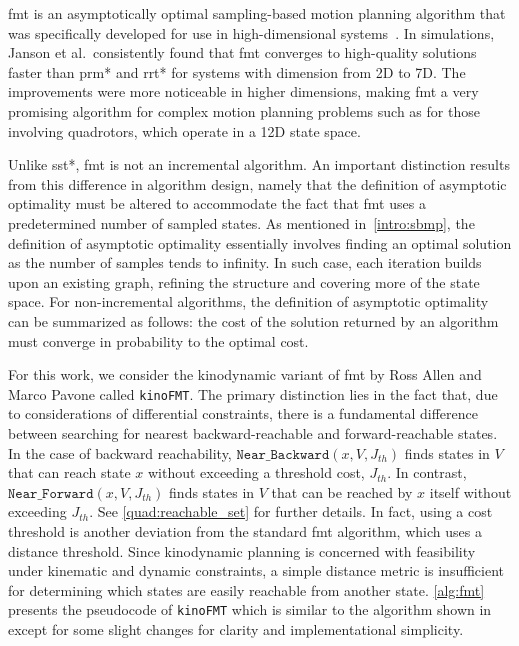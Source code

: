 \gls{fmt} is an asymptotically optimal sampling-based motion planning algorithm that was specifically developed for use in high-dimensional systems~\cite{Janson2015}. In simulations, Janson et al.\ consistently found that \gls{fmt} converges to high-quality solutions faster than \gls{prm}* and \gls{rrt}* for systems with dimension from 2D to 7D. The improvements were more noticeable in higher dimensions, making \gls{fmt} a very promising algorithm for complex motion planning problems such as for those involving quadrotors, which operate in a 12D state space.

Unlike \gls{sst}*, \gls{fmt} is not an incremental algorithm. An important distinction results from this difference in algorithm design, namely that the definition of asymptotic optimality must be altered to accommodate the fact that \gls{fmt} uses a predetermined number of sampled states. As mentioned in~\ref{intro:sbmp}, the definition of asymptotic optimality essentially involves finding an optimal solution as the number of samples tends to infinity. In such case, each iteration builds upon an existing graph, refining the structure and covering more of the state space. For non-incremental algorithms, the definition of asymptotic optimality can be summarized as follows: the cost of the solution returned by an algorithm must converge in probability to the optimal cost.

For this work, we consider the kinodynamic variant of \gls{fmt} by Ross Allen and Marco Pavone called \texttt{kinoFMT}. The primary distinction lies in the fact that, due to considerations of differential constraints, there is a fundamental difference between searching for nearest backward-reachable and forward-reachable states. In the case of backward reachability, $\texttt{Near\_Backward}(x,V,J_{th})$ finds states in $V$ that can reach state $x$ without exceeding a threshold cost, $J_{th}$. In contrast, $\texttt{Near\_Forward}(x,V,J_{th})$ finds states in $V$ that can be reached by $x$ itself without exceeding $J_{th}$. See \autoref{quad:reachable_set} for further details. In fact, using a cost threshold is another deviation from the standard \gls{fmt} algorithm, which uses a distance threshold. Since kinodynamic planning is concerned with feasibility under kinematic and dynamic constraints, a simple distance metric is insufficient for determining which states are easily reachable from another state. \autoref{alg:fmt} presents the pseudocode of \texttt{kinoFMT} which is similar to the algorithm shown in~\cite{Allen2016} except for some slight changes for clarity and implementational simplicity.

